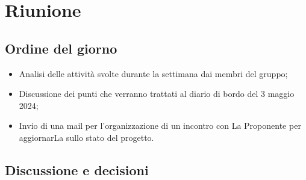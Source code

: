 \section{Riunione}
\subsection{Ordine del giorno}
\begin{itemize}
	\item Analisi delle attività svolte durante la settimana dai membri del gruppo;
	\item Discussione dei punti che verranno trattati al diario di bordo del 3 maggio 2024;
	\item Invio di una mail per l'organizzazione di un incontro con La Proponente per aggiornarLa sullo stato del progetto.
\end{itemize}

\subsection{Discussione e decisioni}
